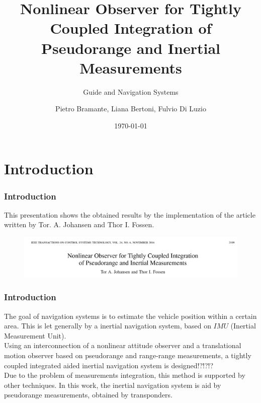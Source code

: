 \documentclass{beamer}
\title{Nonlinear Observer for Tightly Coupled Integration of Pseudorange and Inertial Measurements}
\subtitle{Guide and Navigation Systems}
\author{Pietro Bramante, Liana Bertoni, Fulvio Di Luzio}
\institute{Universit\`a degli Studi di Pisa \\ Master's Degree in Robotics and Automation Engineering}
\date{\today}
\begin{document}
    \begin{frame}
	\titlepage
	\end{frame}	


\section{Introduction}
	\begin{frame}
	\frametitle{Introduction}
		This presentation shows the obtained results by the implementation of the article written by Tor. A. Johansen and Thor I. Fossen.
		\vspace{0.5cm}
		
	\begin{figure}[H]
			\centering
			\includegraphics[scale=0.3]{title}
		\end{figure}
	\end{frame}
	\begin{frame}
	\frametitle{Introduction}
	The goal of navigation systems is to estimate the vehicle position within a certain area. This is let generally by a inertial navigation system, based on $IMU$ (Inertial Measurement Unit).\\
	
	Using an interconnection of a nonlinear attitude observer and a translational motion observer based on pseudorange and range-range measurements, a tightly coupled integrated aided inertial navigation system is designed!?!?!?\\
	
	Due to the problem of measurements integration, this method is supported by other techniques. In this work, the inertial navigation system is aid by pseudorange measurements, obtained by transponders.
	\end{frame}
\end{document}
